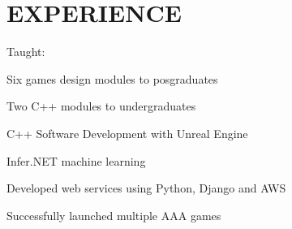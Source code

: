 \documentclass[]{deedy-resume-reversed}
\begin{document}
%
%

%
%


%
%

\begin{minipage}[t]{0.55\textwidth}


\section{EXPERIENCE}

Taught:\\
\vspace{\topsep} %
\begin{tightemize}
\item Six games design modules to posgraduates
\item Two C++ modules to undergraduates
\end{tightemize}
\sectionsep

\begin{tightemize}
\item C++ Software Development with Unreal Engine
\item Infer.NET machine learning
\end{tightemize}
\sectionsep

\begin{tightemize}
\item Developed web services using Python, Django and AWS
\item Successfully launched multiple AAA games
\end{tightemize}
\sectionsep


\end{minipage}
\end{document}
